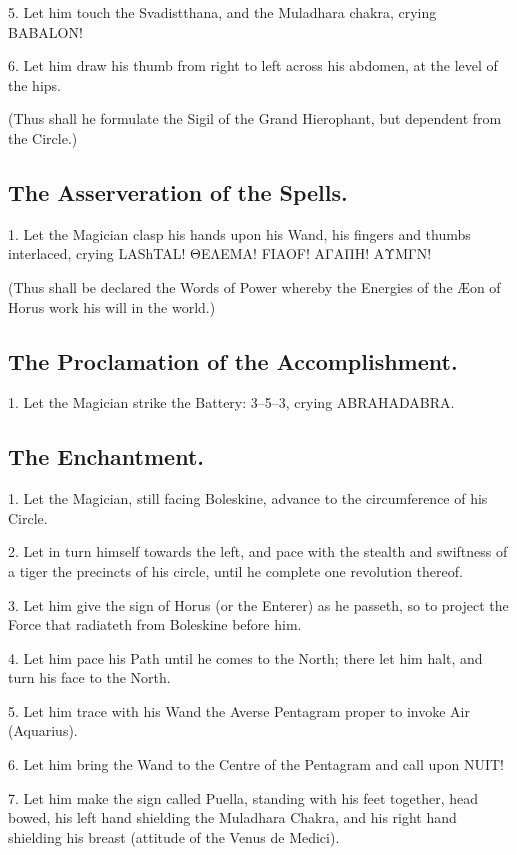5. Let him touch the Svadistthana, and the Muladhara chakra, crying BABALON!

6. Let him draw his thumb from right to left across his abdomen, at the level of the hips.

(Thus shall he formulate the Sigil of the Grand Hierophant, but dependent from the Circle.)

\subsection*{The Asserveration of the Spells.}

1. Let the Magician clasp his hands upon his Wand, his fingers and thumbs interlaced, crying LAShTAL! ΘΕΛΕΜΑ! FIAOF! ΑΓΑΠΗ! ΑΥΜΓΝ!

(Thus shall be declared the Words of Power whereby the Energies of the \AE{}on of Horus work his will in the world.)

\subsection*{The Proclamation of the Accomplishment.}

1. Let the Magician strike the Battery: 3–5–3, crying ABRAHADABRA.

\subsection*{The Enchantment.}

1. Let the Magician, still facing Boleskine, advance to the circumference of his Circle.

2. Let in turn himself towards the left, and pace with the stealth and swiftness of a tiger the precincts of his circle, until he complete one revolution thereof.

3. Let him give the sign of Horus (or the Enterer) as he passeth, so to project the Force that radiateth from Boleskine before him.

4. Let him pace his Path until he comes to the North; there let him halt, and turn his face to the North.

5. Let him trace with his Wand the Averse Pentagram proper to invoke Air (Aquarius).

6. Let him bring the Wand to the Centre of the Pentagram and call upon NUIT!

7. Let him make the sign called Puella, standing with his feet together, head bowed, his left hand shielding the Muladhara Chakra, and his right hand shielding his breast (attitude of the Venus de Medici).

